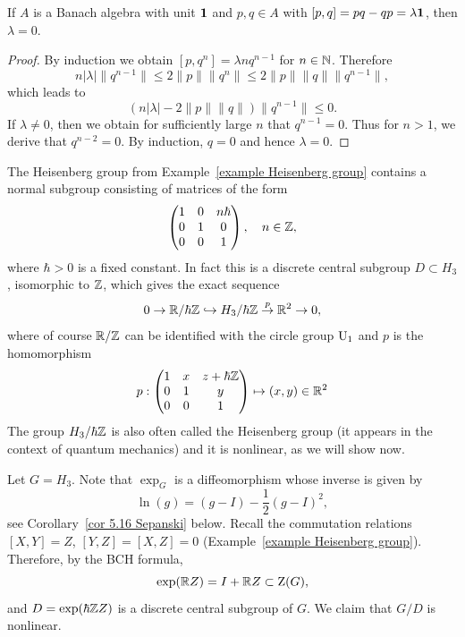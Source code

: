 \begin{lem}
    If $A$ is a Banach algebra with unit $\bf{1}$ and $p,q\in A$ with $[p,q]=pq-qp=\lambda \bf{1}$, then $\lambda=0$.
\end{lem}
\begin{proof}
    By induction we obtain $[p,q^n]=\lambda nq^{n-1}$ for $n\in\bbN$. Therefore
    \[n|\lambda|\lVert q^{n-1}\rVert\leq 2\lVert p\rVert \lVert q^n\rVert\leq 2\lVert p\rVert \lVert q\rVert \lVert q^{n-1}\rVert,\]
    which leads to
    \[\left(n|\lambda|-2\lVert p\rVert \lVert q\rVert\right)\lVert q^{n-1}\rVert \leq 0.\]
    If $\lambda\neq 0$, then we obtain for sufficiently large $n$ that $q^{n-1}=0$. Thus for $n>1$, we derive that $q^{n-2}=0$. By induction, $q=0$ and hence $\lambda=0$.
\end{proof}


\begin{example}\label{example quantum heisenberg}
    The Heisenberg group from Example~\ref{example Heisenberg group} contains a normal subgroup consisting of matrices of the form
    \[
    \begin{pmatrix}
        1&0&n\hbar\\
        0&1&0\\
        0&0&1
    \end{pmatrix},\quad n\in\bbZ,
    \]
    where $\hbar >0$ is a fixed constant. In fact this is a discrete central subgroup $D\subset H_3$, isomorphic to $\bbZ$, which gives the exact sequence
    \[0\to \bbR\slash \hbar\bbZ\hookrightarrow H_3\slash \hbar\bbZ \overset{p}{\to} \bbR^2\to 0,\]
    where of course $\bbR\slash\bbZ$ can be identified with the circle group $\U_1$ and $p$ is the homomorphism
    \[p: 
     \begin{pmatrix}
        1&x&z+\hbar\bbZ\\
        0&1&y\\
        0&0&1
    \end{pmatrix}
    \mapsto (x,y)\in\bbR^2
    \]
    The group $H_3\slash \hbar\bbZ$ is also often called the Heisenberg group (it appears in the context of quantum mechanics) and it is nonlinear, as we will show now.
    
    Let $G=H_3$. Note that $\exp_G$ is a diffeomorphism whose inverse is given by 
    \[\ln(g)=(g-I)-\frac12(g-I)^2,\]
    see Corollary~\ref{cor 5.16 Sepanski} below. Recall the commutation relations $[X,Y]=Z$, $[Y,Z]=[X,Z]=0$ (Example~\ref{example Heisenberg group}). Therefore, by the BCH formula,
    \[\exp(\bbR Z)=I+\bbR Z\subset \rmZ(G),\]
    and $D=\exp(\hbar\bbZ Z)$ is a discrete central subgroup of $G$. We claim that $G\slash D$ is nonlinear.


\end{example}
